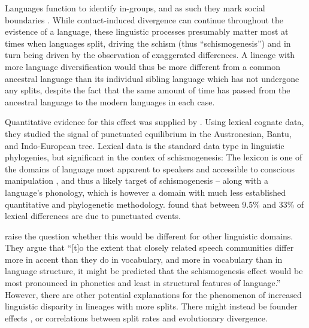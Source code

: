 \documentclass[]{rsos}%
\begin{document}
Languages function to identify in-groups, and as such they mark social
boundaries \parencite{labov1963social,epps2020amazonian}.
While contact-induced divergence \parencite{evans2019linguistic} can continue
throughout the evistence of a language, these linguistic processes presumably
matter most at times when languages split, driving the schism (thus
“schismogenesis”) and in turn being driven by the observation of exaggerated
differences. A lineage with more language diversification would thus be more
different from a common ancestral language than its individual sibling language
which has not undergone any splits, despite the fact that the same amount of
time has passed from the ancestral language to the modern languages in each
case.

Quantitative evidence for this effect was supplied by
\textcite{atkinson2008languages}. Using lexical cognate data, they studied the
signal of punctuated equilibrium \parencite{eldredge1972punctuated} in the
Austronesian, Bantu, and Indo-European tree.
Lexical data is the standard data type in linguistic phylogenies,
but significant in the contex of schismogenesis:
The lexicon is one of the domains
of language most apparent to speakers and accessible to conscious manipulation
\parencite[see][for an extensive discussion]{thomason2007language}, and thus a
likely target of schismogenesis – along with a language's phonology, which is
however a domain with much less established quantitative and phylogenetic
methodology.  found that between 9.5\% and
33\% of lexical differences are due to punctuated events.


\Textcite{gray2013three} raise the question whether this would be different for
other linguistic domains. They argue that “[t]o the extent that closely related
speech communities differ more in accent than they do in vocabulary, and more in
vocabulary than in language structure, it might be predicted that the
schismogenesis effect would be most pronounced in phonetics and least in
structural features of language.” \parencite[p. 295]{gray2013three} However,
there are other potential explanations for the phenomenon of increased
linguistic disparity in lineages with more splits. There might instead be
founder effects \parencite{atkinson2008languages,greenhill2017evolutionary},
or correlations between split rates and evolutionary divergence.
\end{document}
